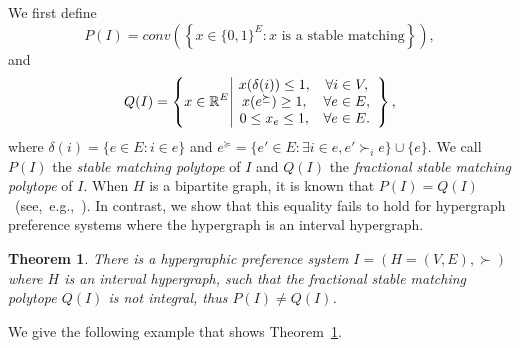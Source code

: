 \documentclass[11pt]{article}
\newtheorem{theorem}{Theorem}
\begin{document}
We first define 
\begin{equation}
    P(I)=conv\left(\left\{x\in \{0,1\}^E:x\textrm{ is a stable matching} 
    \right\}\right),
\end{equation}
and
\begin{equation}
    Q(I)=\left\{x\in \mathbb{R}^E\,\vline
    \begin{array}{cc}
      x(\delta(i)) \le 1,  &  \forall i\in V, \\
      x(e^\succeq) \ge 1,   & \forall e\in E, \\
      0\le x_e \le 1, & \forall e\in E.
    \end{array}
    \right\},
\end{equation}
where $\delta(i)=\{e\in E:i\in e\}$ and $e^\succeq=\{e'\in  E:\exists i\in e, e'\succ_i e\}\cup\{e\}$. We call $P(I)$ the \emph{stable matching polytope} of $I$ and $Q(I)$ the \emph{fractional stable matching polytope} of $I$. When $H$ is a bipartite graph, it is known that $P(I)=Q(I)$~(see,~e.g.,~\cite{teo1998geometry}). In contrast, we show that this equality fails to hold for hypergraph preference systems where the hypergraph is an interval hypergraph. 
\begin{theorem}\label{thm:neg}
    There is a hypergraphic preference system $I=(H=(V,E),\succ)$ where $H$ is an interval hypergraph, such that the fractional stable matching polytope $Q(I)$ is not integral, thus $P(I)\neq Q(I)$.
\end{theorem}
We give the following example that shows Theorem~\ref{thm:neg}.
\end{document}
